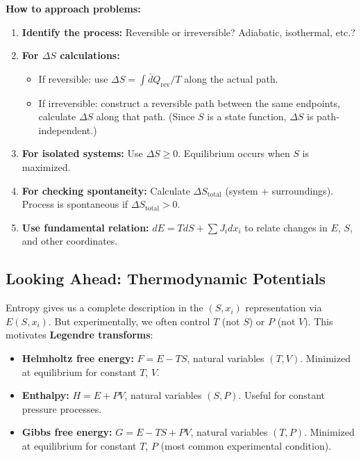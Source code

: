 \documentclass[9pt,twocoloumn]{article}
\begin{document}
\textbf{How to approach problems:}

\begin{enumerate}
    \item \textbf{Identify the process:} Reversible or irreversible? Adiabatic, isothermal, etc.?

    \item \textbf{For $\Delta S$ calculations:}
    \begin{itemize}
        \item If reversible: use $\Delta S = \int \bar{d}Q_{\text{rev}}/T$ along the actual path.
        \item If irreversible: construct a reversible path between the same endpoints, calculate $\Delta S$ along that path. (Since $S$ is a state function, $\Delta S$ is path-independent.)
    \end{itemize}

    \item \textbf{For isolated systems:} Use $\Delta S \geq 0$. Equilibrium occurs when $S$ is maximized.

    \item \textbf{For checking spontaneity:} Calculate $\Delta S_{\text{total}}$ (system + surroundings). Process is spontaneous if $\Delta S_{\text{total}} > 0$.

    \item \textbf{Use fundamental relation:} $dE = T dS + \sum J_i dx_i$ to relate changes in $E$, $S$, and other coordinates.
\end{enumerate}

\subsection{Looking Ahead: Thermodynamic Potentials}

Entropy gives us a complete description in the $(S, x_i)$ representation via $E(S, x_i)$. But experimentally, we often control $T$ (not $S$) or $P$ (not $V$). This motivates \textbf{Legendre transforms}:

\begin{itemize}
    \item \textbf{Helmholtz free energy:} $F = E - TS$, natural variables $(T, V)$. Minimized at equilibrium for constant $T$, $V$.
    \item \textbf{Enthalpy:} $H = E + PV$, natural variables $(S, P)$. Useful for constant pressure processes.
    \item \textbf{Gibbs free energy:} $G = E - TS + PV$, natural variables $(T, P)$. Minimized at equilibrium for constant $T$, $P$ (most common experimental condition).
\end{itemize}
\end{document}
